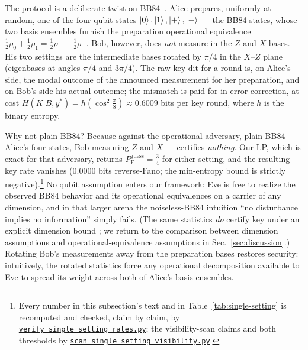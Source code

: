 \documentclass[aps,pra,twocolumn,superscriptaddress,longbibliography,nofootinbib]{revtex4-2}
\newcommand{\Eve}{\mathrm{E}}
\newcommand{\pguess}{P_{\Eve}^{\mathrm{guess}}}
\newcommand{\repoBase}{https://github.com/eliewolfe/RandomnessWinterSchool2026/blob/main/paper/scripts}
\newcommand{\repoScript}[1]{\href{\repoBase/#1}{\texttt{#1}}}
\begin{document}
The protocol is a deliberate twist on BB84~\cite{BB84}. Alice prepares,
uniformly at random, one of the four qubit states
$\ket{0},\ket{1},\ket{+},\ket{-}$ --- the BB84 states, whose two basis
ensembles furnish the preparation operational equivalence
$\tfrac12\rho_{0}+\tfrac12\rho_{1}=\tfrac12\rho_{+}+\tfrac12\rho_{-}$.
Bob, however, does \emph{not} measure in the $Z$ and $X$ bases. His two
settings are the intermediate bases rotated by $\pi/4$ in the $X$--$Z$
plane (eigenbases at angles $\pi/4$ and $3\pi/4$). The raw key dit for a
round is, on Alice's side, the modal outcome of the announced
measurement for her preparation, and on Bob's side his actual outcome;
the mismatch is paid for in error correction, at cost
$H(K|B,y^{\ast})=h\!\left(\cos^{2}\tfrac{\pi}{8}\right)\approx 0.6009$
bits per key round, where $h$ is the binary entropy.

Why not plain BB84? Because against the operational adversary, plain
BB84 --- Alice's four states, Bob measuring $Z$ and $X$ --- certifies
\emph{nothing}. Our LP, which is exact for that adversary, returns
$\pguess = \tfrac34$ for either setting, and the resulting key rate
vanishes ($0.0000$ bits reverse-Fano; the min-entropy bound is strictly
negative).\footnote{Every number in this subsection's text and in
Table~\ref{tab:single-setting} is recomputed and checked, claim by
claim, by \repoScript{verify\_single\_setting\_rates.py}; the
visibility-scan claims and both thresholds by
\repoScript{scan\_single\_setting\_visibility.py}.} No qubit assumption
enters our framework: Eve is free to
realize the observed BB84 behavior and its operational equivalences on a
carrier of any dimension, and in that larger arena the noiseless-BB84
intuition ``no disturbance implies no information'' simply fails. (The
same statistics \emph{do} certify key under an explicit dimension bound
\cite{PawlowskiBrunner2011}; we return to the comparison between
dimension assumptions and operational-equivalence assumptions in
Sec.~\ref{sec:discussion}.) Rotating Bob's measurements away from the
preparation bases restores security: intuitively, the rotated statistics
force any operational decomposition available to Eve to spread its
weight across both of Alice's basis ensembles.
\end{document}
